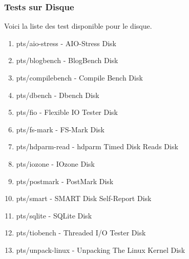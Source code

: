 \documentclass[french]{article}
\begin{document}
\subsubsection{Tests sur Disque}
Voici la liste des test disponible pour le disque.\\
\begin{enumerate}
\item pts/aio-stress                 - AIO-Stress                          Disk    
\item pts/blogbench                  - BlogBench                           Disk     
\item pts/compilebench               - Compile Bench                       Disk     
\item pts/dbench                     - Dbench                              Disk     
\item pts/fio                        - Flexible IO Tester                  Disk    
\item pts/fs-mark                    - FS-Mark                             Disk    
\item pts/hdparm-read                - hdparm Timed Disk Reads             Disk     
\item pts/iozone                     - IOzone                              Disk   
\item pts/postmark                   - PostMark                            Disk   
\item pts/smart                      - SMART Disk Self-Report              Disk    
\item pts/sqlite                     - SQLite                              Disk     
\item pts/tiobench                   - Threaded I/O Tester                 Disk   
\item pts/unpack-linux               - Unpacking The Linux Kernel          Disk 

\end{enumerate}
\end{document}
